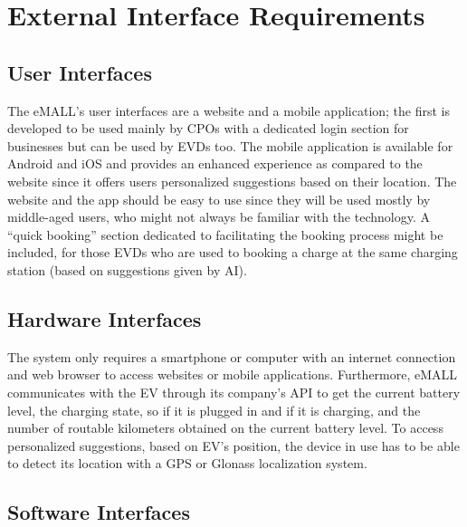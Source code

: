 \section{External Interface Requirements}
\label{sec:external_interface_requirements}%

\subsection{User Interfaces}
\label{subsec:user_interfaces}%
The eMALL’s user interfaces are a website and a mobile application;
the first is developed to be used mainly by CPOs with a dedicated login section for businesses but can be used by EVDs too.
The mobile application is available for Android and iOS and provides an enhanced experience as compared to the website
since it offers users personalized suggestions based on their location.
The website and the app should be easy to use since they will be used mostly by middle-aged users,
who might not always be familiar with the technology.
A “quick booking” section dedicated to facilitating the booking process might be included,
for those EVDs who are used to booking a charge at the same charging station (based on suggestions given by AI).

\subsection{Hardware Interfaces}
\label{subsec:hardware_interfaces}%
The system only requires a smartphone or computer with an internet connection and web browser to access websites or mobile applications.
Furthermore, eMALL communicates with the EV through its company's API to get the current battery level, the charging state,
so if it is plugged in and if it is charging, and the number of routable kilometers obtained on the current battery level.
To access personalized suggestions, based on EV’s position, the device in use has to be able to detect its location with a GPS or Glonass localization system.

\subsection{Software Interfaces}
\label{subsec:software_interfaces}%


